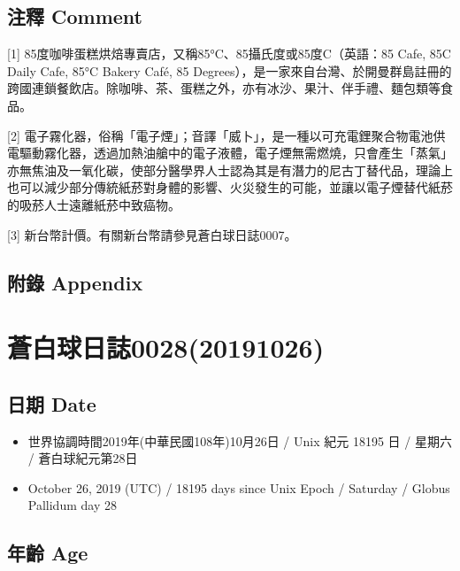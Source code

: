 \documentclass[a5paper, 12pt
]{book}
\providecommand{\tightlist}{%
  \setlength{\itemsep}{0pt}\setlength{\parskip}{0pt}}
\begin{document}
\hypertarget{ux6ce8ux91cb-comment-20}{%
\subsection{注釋 Comment}\label{ux6ce8ux91cb-comment-20}}

{[}1{]} 85度咖啡蛋糕烘焙專賣店，又稱85°C、85攝氏度或85度C（英語：85
Cafe, 85C Daily Cafe, 85°C Bakery Café, 85
Degrees），是一家來自台灣、於開曼群島註冊的跨國連鎖餐飲店。除咖啡、茶、蛋糕之外，亦有冰沙、果汁、伴手禮、麵包類等食品。

{[}2{]}
電子霧化器，俗稱「電子煙」；音譯「威卜」，是一種以可充電鋰聚合物電池供電驅動霧化器，透過加熱油艙中的電子液體，電子煙無需燃燒，只會產生「蒸氣」亦無焦油及一氧化碳，使部分醫學界人士認為其是有潛力的尼古丁替代品，理論上也可以減少部分傳統紙菸對身體的影響、火災發生的可能，並讓以電子煙替代紙菸的吸菸人士遠離紙菸中致癌物。

{[}3{]} 新台幣計價。有關新台幣請參見蒼白球日誌0007。

\hypertarget{ux9644ux9304-appendix-19}{%
\subsection{附錄 Appendix}\label{ux9644ux9304-appendix-19}}

\hypertarget{ux84bcux767dux7403ux65e5ux8a8c002820191026}{%
\section{蒼白球日誌0028(20191026)}\label{ux84bcux767dux7403ux65e5ux8a8c002820191026}}

\hypertarget{ux65e5ux671f-date-25}{%
\subsection{日期 Date}\label{ux65e5ux671f-date-25}}

\begin{itemize}
\tightlist
\item
  世界協調時間2019年(中華民國108年)10月26日 / Unix 紀元 18195 日 /
  星期六 / 蒼白球紀元第28日
\item
  October 26, 2019 (UTC) / 18195 days since Unix Epoch / Saturday /
  Globus Pallidum day 28
\end{itemize}

\hypertarget{ux5e74ux9f61-age-25}{%
\subsection{年齡 Age}\label{ux5e74ux9f61-age-25}}
\end{document}
